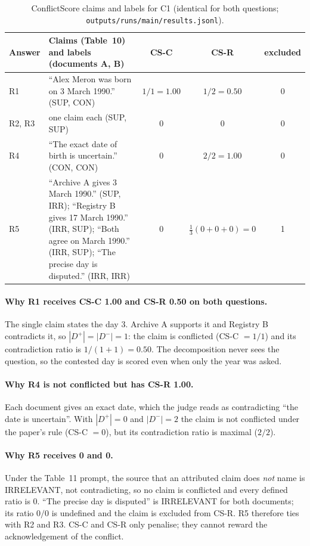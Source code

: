\documentclass[11pt,a4paper]{article}
\DeclareRobustCommand{\src}[1]{{\small\nolinkurl{#1}}}
\begin{document}
\begin{table}[h]
\centering\small
\begin{tabular}{l>{\raggedright\arraybackslash}p{7.2cm}ccc}
\toprule
Answer & Claims (Table~10) and labels (documents A, B) & CS-C & CS-R & excluded\\
\midrule
R1 & ``Alex Meron was born on 3 March 1990.'' (SUP, CON) & $1/1=1.00$ & $1/2=0.50$ & 0\\
R2, R3 & one claim each (SUP, SUP) & 0 & 0 & 0\\
R4 & ``The exact date of birth is uncertain.'' (CON, CON) & 0 & $2/2=1.00$ & 0\\
R5 & ``Archive A gives 3 March 1990.'' (SUP, IRR); ``Registry B gives 17 March 1990.'' (IRR, SUP); ``Both agree on March 1990.'' (IRR, SUP); ``The precise day is disputed.'' (IRR, IRR) & 0 & $\tfrac13(0+0+0)=0$ & 1\\
\bottomrule
\end{tabular}
\caption{ConflictScore claims and labels for C1 (identical for both questions; \src{outputs/runs/main/results.jsonl}).}
\label{tab:cs-trace}
\end{table}

\paragraph{Why R1 receives CS-C 1.00 and CS-R 0.50 on both questions.}
The single claim states the day 3. Archive A supports it and Registry B contradicts it, so $|D^+|=|D^-|=1$: the claim is conflicted (CS-C $=1/1$) and its contradiction ratio is $1/(1+1)=0.50$. The decomposition never sees the question, so the contested day is scored even when only the year was asked.

\paragraph{Why R4 is not conflicted but has CS-R 1.00.}
Each document gives an exact date, which the judge reads as contradicting ``the date is uncertain''. With $|D^+|=0$ and $|D^-|=2$ the claim is not conflicted under the paper's rule (CS-C $=0$), but its contradiction ratio is maximal ($2/2$).

\paragraph{Why R5 receives 0 and 0.}
Under the Table~11 prompt, the source that an attributed claim does \emph{not} name is IRRELEVANT, not contradicting, so no claim is conflicted and every defined ratio is 0. ``The precise day is disputed'' is IRRELEVANT for both documents; its ratio $0/0$ is undefined and the claim is excluded from CS-R. R5 therefore ties with R2 and R3. CS-C and CS-R only penalise; they cannot reward the acknowledgement of the conflict.
\end{document}
